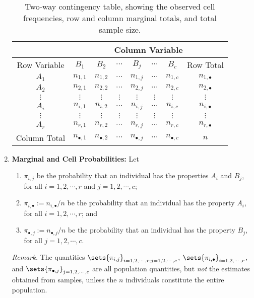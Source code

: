 \documentclass[12pt]{article}
\begin{document}
\begin{enumerate}[label=\textbf{\arabic*.}]
	\begin{table}
	\centering
		\begin{tabular}{ cccccccc}%
			\toprule
			& \multicolumn{7}{c}{Column Variable} \\
			\midrule 
			Row Variable & $B_1$ & $B_2$ & $\cdots$ & $B_j$ & $\cdots$ & $B_c$ & Row Total \\ 
			\midrule 
			$A_1$ & $n_{1,1}$ & $n_{1,2}$ & $\cdots$ & $n_{1,j}$ & $\cdots$ & $n_{1,c}$ & $n_{1,\bullet}$ \\ 
			$A_2$ & $n_{2,1}$ & $n_{2,2}$ & $\cdots$ & $n_{2,j}$ & $\cdots$ & $n_{2,c}$ & $n_{2,\bullet}$ \\ 
			$\vdots$ & $\vdots$ & $\vdots$ & $\vdots$ & $\vdots$ & $\vdots$ & $\vdots$ & $\vdots$ \\ 
			$A_i$ & $n_{i,1}$ & $n_{i,2}$ & $\cdots$ & $n_{i,j}$ & $\cdots$ & $n_{i,c}$ & $n_{i,\bullet}$ \\ 
			$\vdots$ & $\vdots$ & $\vdots$ & $\vdots$ & $\vdots$ & $\vdots$ & $\vdots$ & $\vdots$ \\ 
			$A_r$ & $n_{r,1}$ & $n_{r,2}$ & $\cdots$ & $n_{r,j}$ & $\cdots$ & $n_{r,c}$ & $n_{r,\bullet}$ \\ 
			\midrule 
			Column Total & $n_{\bullet, 1}$ & $n_{\bullet, 2}$ & $\cdots$ & $n_{\bullet,j}$ & $\cdots$ & $n_{\bullet,c}$ & $n$
		\end{tabular}
		\caption{Two-way contingency table, showing the observed cell frequencies, row and column marginal totals, and total sample size.}
		\label{table-two-way-contingency}
	\end{table}
	
	\item \textbf{Marginal and Cell Probabilities:} Let 
	\begin{enumerate}
		\item $\pi_{i, j}$ be the probability that an individual has the properties $A_i$ and $B_j$, for all $i = 1, 2, \cdots, r$ and $j = 1, 2, \cdots, c$; 
		\item $\pi_{i, \bullet} := n_{i, \bullet} / n$ be the probability that an individual has the property $A_i$, for all $i = 1, 2, \cdots, r$; and 
		\item $\pi_{\bullet,j} := n_{\bullet,j} / n$ be the probability that an individual has the property $B_j$, for all $j = 1, 2, \cdots, c$. 
	\end{enumerate}
	
	\textit{Remark.} The quantities $\sets{\pi_{i, j}}_{i=1,2,\cdots,r; j=1,2,\cdots,c}$, $\sets{\pi_{i, \bullet}}_{i=1,2,\cdots,r}$, and $\sets{\pi_{\bullet,j}}_{j=1,2,\cdots,c}$ are all population quantities, but \emph{not} the estimates obtained from samples, unless the $n$ individuals constitute the entire population. 
	

\end{enumerate}
\end{document}
